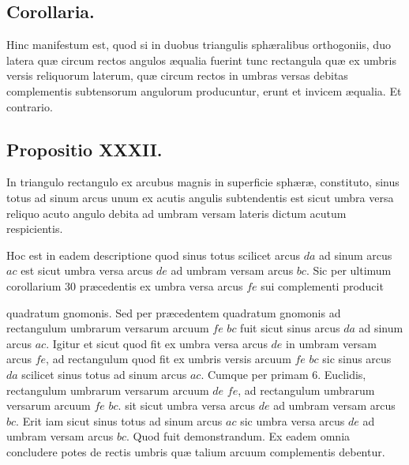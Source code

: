 \documentclass[11pt,a4paper]{article}
\begin{document}
\subsection*{Corollaria.}

Hinc manifestum est, quod si in duobus triangulis sphæralibus
orthogoniis, duo latera quæ circum rectos angulos æqualia fuerint
tunc rectangula quæ ex umbris versis reliquorum laterum, quæ
circum rectos in umbras versas debitas complementis subtensorum
angulorum producuntur, erunt et invicem æqualia. Et contrario.

\subsection*{Propositio XXXII.}

In triangulo rectangulo ex arcubus magnis in superficie sphæræ,
constituto, sinus totus ad sinum arcus unum ex acutis angulis
subtendentis est sicut umbra versa reliquo acuto angulo debita
ad umbram versam lateris dictum acutum respicientis.

Hoc est in eadem descriptione \ill{} quod sinus totus scilicet
arcus $da$ ad sinum arcus $ac$ est sicut umbra versa arcus $de$
ad umbram versam arcus $bc$. Sic per ultimum corollarium 30
præcedentis ex umbra versa arcus $fe$ sui complementi producit

quadratum gnomonis. Sed per præcedentem quadratum gnomonis
ad rectangulum umbrarum versarum arcuum $fe$ $bc$ fuit sicut
sinus arcus $da$ ad sinum arcus $ac$. Igitur et sicut quod fit
ex umbra versa arcus $de$ in umbram versam arcus $fe$, ad
rectangulum quod fit ex umbris versis arcuum $fe$ $bc$ sic sinus arcus
$da$ scilicet sinus totus ad sinum arcus $ac$. Cumque per primam
6. Euclidis, rectangulum umbrarum versarum arcuum $de$ $fe$,
ad rectangulum umbrarum versarum arcuum $fe$ $bc$. sit sicut
umbra versa arcus $de$ ad umbram versam arcus $bc$. Erit iam
sicut sinus totus ad sinum arcus $ac$ sic umbra versa arcus
$de$ ad umbram versam arcus $bc$. Quod fuit demonstrandum.
Ex eadem omnia concludere potes de rectis umbris quæ
talium arcuum complementis debentur.
\end{document}
